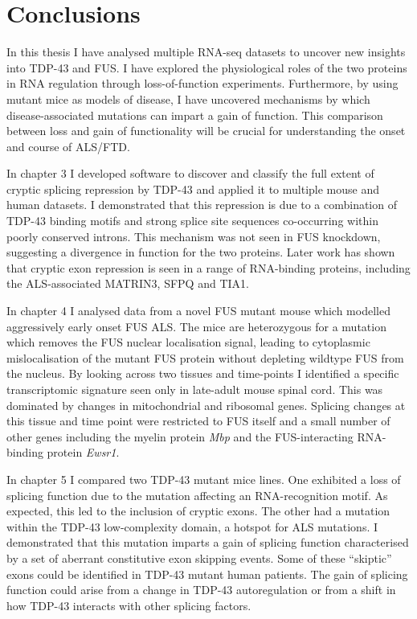 \chapter{Conclusions}



In this thesis I have analysed multiple RNA-seq datasets to uncover new insights into TDP-43 and FUS.
I have explored the physiological roles of the two proteins in RNA regulation through loss-of-function experiments.
Furthermore, by using mutant mice as models of disease, I have uncovered mechanisms by which disease-associated mutations can impart a gain of function. 
This comparison between loss and gain of functionality will be crucial for understanding the onset and course of ALS/FTD.

In chapter 3 I developed software to discover and classify the full extent of cryptic splicing repression by TDP-43 and applied it to multiple mouse and human datasets.
I demonstrated that this repression is due to a combination of TDP-43 binding motifs and strong splice site sequences co-occurring within poorly conserved introns.
This mechanism was not seen in FUS knockdown, suggesting a divergence in function for the two proteins.
Later work has shown that cryptic exon repression is seen in a range of RNA-binding proteins, including the ALS-associated MATRIN3, SFPQ and TIA1.

In chapter 4 I analysed data from a novel FUS mutant mouse which modelled aggressively early onset FUS ALS. 
The mice are heterozygous for a mutation which removes the FUS nuclear localisation signal, leading to cytoplasmic mislocalisation of the mutant FUS protein without depleting wildtype FUS from the nucleus.
By looking across two tissues and time-points I identified a specific transcriptomic signature seen only in late-adult mouse spinal cord.
This was dominated by changes in mitochondrial and ribosomal genes.
Splicing changes at this tissue and time point were restricted to FUS itself and a small number of other genes including the myelin protein \textit{Mbp} and the FUS-interacting RNA-binding protein \textit{Ewsr1}.

In chapter 5 I compared two TDP-43 mutant mice lines. 
One exhibited a loss of splicing function due to the mutation affecting an RNA-recognition motif. 
As expected, this led to the inclusion of cryptic exons.
The other had a mutation within the TDP-43 low-complexity domain, a hotspot for ALS mutations.
I demonstrated that this mutation imparts a gain of splicing function characterised by a set of aberrant constitutive exon skipping events.
Some of these ``skiptic'' exons could be identified in TDP-43 mutant human patients.
The gain of splicing function could arise from a change in TDP-43 autoregulation or from a shift in how TDP-43 interacts with other splicing factors. 

